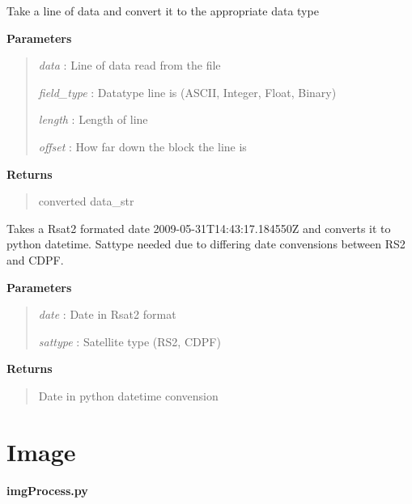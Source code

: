 \documentclass[letterpaper,10pt,openany,oneside]{sphinxmanual}
\begin{document}

\begin{fulllineitems}
\label{code:Metadata.get_field_value}
Take a line of data and convert it to the appropriate data type

\textbf{Parameters}
\begin{quote}

\emph{data}       :  Line of data read from the file

\emph{field\_type} :  Datatype line is (ASCII, Integer, Float, Binary)

\emph{length}     :  Length of line

\emph{offset}     :  How far down the block the line is
\end{quote}

\textbf{Returns}
\begin{quote}

converted data\_str
\end{quote}

\end{fulllineitems}


\begin{fulllineitems}
\label{code:Metadata.readdate}
Takes a Rsat2 formated date 2009-05-31T14:43:17.184550Z
and converts it to python datetime. Sattype needed due to
differing date convensions between RS2 and CDPF.

\textbf{Parameters}
\begin{quote}

\emph{date} : Date in Rsat2 format

\emph{sattype} : Satellite type (RS2, CDPF)
\end{quote}

\textbf{Returns}
\begin{quote}

Date in python datetime convension
\end{quote}

\end{fulllineitems}



\section{Image}
\label{code:module-Image}\label{code:image}
\textbf{imgProcess.py}
\end{document}
